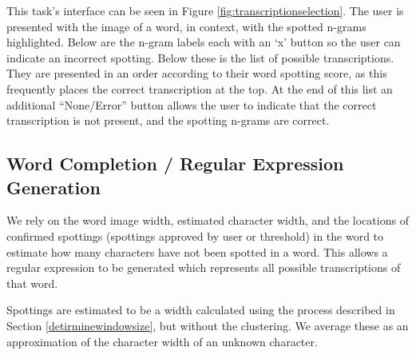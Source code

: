 \documentclass[ms,electronic,twosidetoc,letterpaper,chaptercenter,parttop,lof,lot]{byumsphd}
\begin{document}
This task's interface can be seen in Figure \ref{fig:transcriptionselection}.
The user is presented with the image of a word, in context, with the spotted n-grams highlighted. Below are the n-gram labels each with an `x' button so the user can indicate an incorrect spotting.
Below these is the list of possible transcriptions. They are presented in an order according to their word spotting score, as this frequently places the correct transcription at the top.
At the end of this list an additional ``None/Error'' button allows the user to indicate that the correct transcription is not present, and the spotting n-grams are correct.






\subsection{Word Completion / Regular Expression Generation}\label{wordcompletion}
We rely on the word image width, estimated character width, and the locations of confirmed spottings (spottings approved by user or threshold) in the word to estimate how many characters have not been spotted in a word. This allows a regular expression to be generated which represents all possible transcriptions of that word.

Spottings are estimated to be a width calculated using the process described in Section \ref{detirminewindowsize}, but without the clustering.
We average these as an approximation of the character width of an unknown character.
\end{document}
